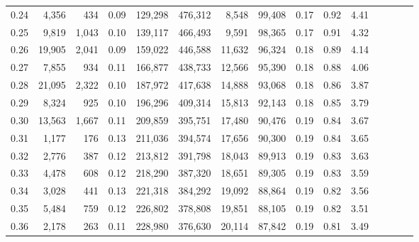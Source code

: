 \begin{tabular}{rrrcrrrrrrrrrrr}
0.24 &   4,356 &    434 &                                       0.09 &  129,298 &  476,312 &    8,548 &   99,408 &  0.17 &  0.92 &                         4.41 \\
0.25 &   9,819 &  1,043 &                                       0.10 &  139,117 &  466,493 &    9,591 &   98,365 &  0.17 &  0.91 &                         4.32 \\
0.26 &  19,905 &  2,041 &                                       0.09 &  159,022 &  446,588 &   11,632 &   96,324 &  0.18 &  0.89 &                         4.14 \\
0.27 &   7,855 &    934 &                                       0.11 &  166,877 &  438,733 &   12,566 &   95,390 &  0.18 &  0.88 &                         4.06 \\
0.28 &  21,095 &  2,322 &                                       0.10 &  187,972 &  417,638 &   14,888 &   93,068 &  0.18 &  0.86 &                         3.87 \\
0.29 &   8,324 &    925 &                                       0.10 &  196,296 &  409,314 &   15,813 &   92,143 &  0.18 &  0.85 &                         3.79 \\
0.30 &  13,563 &  1,667 &                                       0.11 &  209,859 &  395,751 &   17,480 &   90,476 &  0.19 &  0.84 &                         3.67 \\
0.31 &   1,177 &    176 &                                       0.13 &  211,036 &  394,574 &   17,656 &   90,300 &  0.19 &  0.84 &                         3.65 \\
0.32 &   2,776 &    387 &                                       0.12 &  213,812 &  391,798 &   18,043 &   89,913 &  0.19 &  0.83 &                         3.63 \\
0.33 &   4,478 &    608 &                                       0.12 &  218,290 &  387,320 &   18,651 &   89,305 &  0.19 &  0.83 &                         3.59 \\
0.34 &   3,028 &    441 &                                       0.13 &  221,318 &  384,292 &   19,092 &   88,864 &  0.19 &  0.82 &                         3.56 \\
0.35 &   5,484 &    759 &                                       0.12 &  226,802 &  378,808 &   19,851 &   88,105 &  0.19 &  0.82 &                         3.51 \\
0.36 &   2,178 &    263 &                                       0.11 &  228,980 &  376,630 &   20,114 &   87,842 &  0.19 &  0.81 &                         3.49 \\

\end{tabular}
